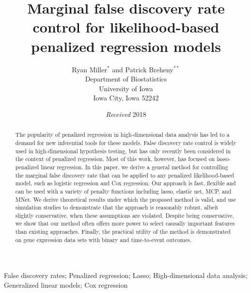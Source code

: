 \documentclass[useAMS,usenatbib,referee]{biom}
\title{Marginal false discovery rate control for likelihood-based penalized regression models}
\author{Ryan Miller$^{*}$\email{ryan-e-miller@uiowa.edu} and
  Patrick Breheny$^{**}$\email{patrick-breheny@uiowa.edu} \\
  Department of Biostatistics \\
  University of Iowa \\
  Iowa City, Iowa 52242}
\begin{document}
\date{{\it Received } 2018}

\pagerange{\pageref{firstpage}--\pageref{lastpage}} 


\label{firstpage}

\begin{abstract}
  The popularity of penalized regression in high-dimensional data analysis has led to a demand for new inferential tools for these models. False discovery rate control is widely used in high-dimensional hypothesis testing, but has only recently been considered in the context of penalized regression.  Most of this work, however, has focused on lasso-penalized linear regression. In this paper, we derive a general method for controlling the marginal false discovery rate that can be applied to any penalized likelihood-based model, such as logistic regression and Cox regression. Our approach is fast, flexible and can be used with a variety of penalty functions including lasso, elastic net, MCP, and MNet.  We derive theoretical results under which the proposed method is valid, and use simulation studies to demonstrate that the approach is reasonably robust, albeit slightly conservative, when these assumptions are violated.  Despite being conservative, we show that our method often offers more power to select causally important features than existing approaches.  Finally, the practical utility of the method is demonstrated on gene expression data sets with binary and time-to-event outcomes.
\end{abstract}

\begin{keywords}
False discovery rates; Penalized regression; Lasso; High-dimensional data analysis; Generalized linear models; Cox regression
\end{keywords}

\maketitle





\label{lastpage}
\end{document}
